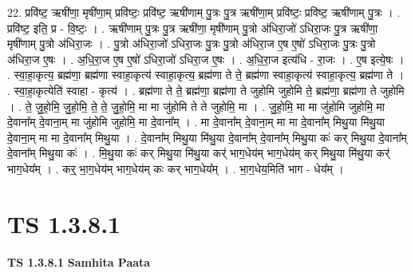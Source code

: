 \documentclass[17pt]{extarticle}
\begin{document}
22. प्रवि॑ष्ट॒ ऋषी॑णा॒ मृषी॑णा॒म् प्रवि॑ष्टः॒ प्रवि॑ष्ट॒ ऋषी॑णाम् पु॒त्रः पु॒त्र ऋषी॑णा॒म् प्रवि॑ष्टः॒ प्रवि॑ष्ट॒ ऋषी॑णाम् पु॒त्रः । . प्रवि॑ष्ट॒ इति॒ प्र - वि॒ष्टः॒ । . ऋषी॑णाम् पु॒त्रः पु॒त्र ऋषी॑णा॒ मृषी॑णाम् पु॒त्रो अ॑धिरा॒जो॑ ऽधिरा॒जः पु॒त्र ऋषी॑णा॒ मृषी॑णाम् पु॒त्रो अ॑धिरा॒जः । . पु॒त्रो अ॑धिरा॒जो॑ ऽधिरा॒जः पु॒त्रः पु॒त्रो अ॑धिरा॒ज ए॒ष ए॒षो॑ ऽधिरा॒जः पु॒त्रः पु॒त्रो अ॑धिरा॒ज ए॒षः । . अ॒धि॒रा॒ज ए॒ष ए॒षो॑ ऽधिरा॒जो॑ ऽधिरा॒ज ए॒षः । . अ॒धि॒रा॒ज इत्य॑धि - रा॒जः । . ए॒ष इत्ये॒षः । . स्वा॒हा॒कृत्य॒ ब्रह्म॑णा॒ ब्रह्म॑णा स्वाहा॒कृत्य॑ स्वाहा॒कृत्य॒ ब्रह्म॑णा ते ते॒ ब्रह्म॑णा स्वाहा॒कृत्य॑ स्वाहा॒कृत्य॒ ब्रह्म॑णा ते । . स्वा॒हा॒कृत्येति॑ स्वाहा - कृत्य॑ । . ब्रह्म॑णा ते ते॒ ब्रह्म॑णा॒ ब्रह्म॑णा ते जुहोमि जुहोमि ते॒ ब्रह्म॑णा॒ ब्रह्म॑णा ते जुहोमि । . ते॒ जु॒हो॒मि॒ जु॒हो॒मि॒ ते॒ ते॒ जु॒हो॒मि॒ मा मा जु॑होमि ते ते जुहोमि॒ मा । . जु॒हो॒मि॒ मा मा जु॑होमि जुहोमि॒ मा दे॒वाना᳚म् दे॒वाना॒म् मा जु॑होमि जुहोमि॒ मा दे॒वाना᳚म् । . मा दे॒वाना᳚म् दे॒वाना॒म् मा मा दे॒वाना᳚म् मिथु॒या मि॑थु॒या दे॒वाना॒म् मा मा दे॒वाना᳚म् मिथु॒या । . दे॒वाना᳚म् मिथु॒या मि॑थु॒या दे॒वाना᳚म् दे॒वाना᳚म् मिथु॒या कः॑ कर् मिथु॒या दे॒वाना᳚म् दे॒वाना᳚म् मिथु॒या कः॑ । . मि॒थु॒या कः॑ कर् मिथु॒या मि॑थु॒या कर्॑ भाग॒धेय॑म् भाग॒धेय॑म् कर् मिथु॒या मि॑थु॒या कर्॑ भाग॒धेय᳚म् । . कर्॒ भा॒ग॒धेय॑म् भाग॒धेय॑म् कः कर् भाग॒धेय᳚म् । . भा॒ग॒धेय॒मिति॑ भाग - धेय᳚म् । \newline
\pagebreak
{}
\section*{ TS 1.3.8.1 }

\textbf{TS 1.3.8.1 } \newline
\textbf{Samhita Paata} \newline
\end{document}

